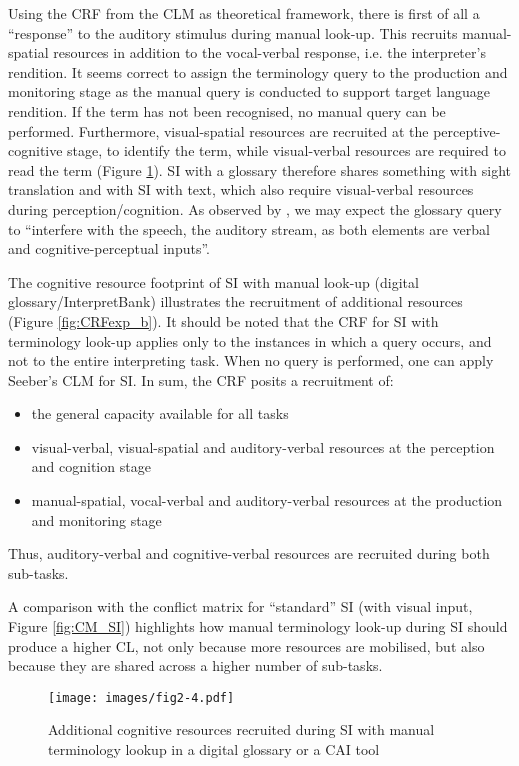 Using the CRF from the CLM as theoretical framework, there is first of all a ``response'' to the auditory stimulus during manual look-up. This recruits manual-spatial resources in addition to the vocal-verbal response, i.e. the interpreter's rendition. It seems correct to assign the terminology query to the production and monitoring stage as the manual query is conducted to support target language rendition. If the term has not been recognised, no manual query can be performed. Furthermore, visual-spatial resources are recruited at the perceptive-cognitive stage, to identify the term, while visual-verbal resources are required to read the term (Figure \ref{fig:CRFexp_a}). SI with a glossary therefore shares something with sight translation and with SI with text, which also require visual-verbal resources during perception/cognition. As observed by \citet[74--75]{gieshoff_impact_2018}, we may expect the glossary query to ``interfere with the speech, the auditory stream, as both elements are verbal and cognitive-perceptual inputs''.

The cognitive resource footprint of SI with manual look-up (digital glossary\slash InterpretBank) illustrates the recruitment of additional resources (Figure \ref{fig:CRFexp_b}). It should be noted that the CRF for SI with terminology look-up applies only to the instances in which a query occurs, and not to the entire interpreting task. When no query is performed, one can apply Seeber's CLM for SI. In sum, the CRF posits a recruitment of:\largerpage

\begin{itemize}
    \item the general capacity available for all tasks
    \item visual-verbal, visual-spatial and auditory-verbal resources at the perception and cognition stage
    \item manual-spatial, vocal-verbal and auditory-verbal resources at the production and monitoring stage
\end{itemize}
Thus, auditory-verbal and cognitive-verbal resources are recruited during both sub-tasks.

A comparison with the conflict matrix for ``standard'' SI (with visual input, Figure \ref{fig:CM_SI}) highlights how manual terminology look-up during SI should produce a higher CL, not only because more resources are mobilised, but also because they are shared across a higher number of sub-tasks.

\begin{figure}
\texttt{[image: images/fig2-4.pdf]}
\caption[Additional cognitive resources recruited during SI with manual terminology lookup]{Additional cognitive resources recruited during SI with manual terminology lookup in a digital glossary or a CAI tool \protect\citep[36]{prandi_exploratory_2018}}
\label{fig:CRFexp_a}
\end{figure}

